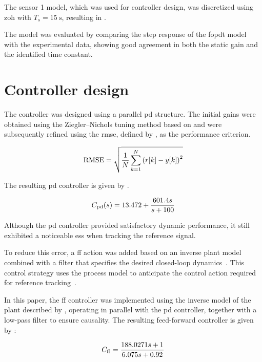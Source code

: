 \documentclass[journal,twoside,a4paper]{SCIndustria}
\begin{document}
{The sensor 1 model, which was used for controller design, was discretized using
\gls{zoh} with $T_s = \SI{15}{\second}$, resulting in .

The model was evaluated by comparing the step response of the \gls{fopdt} model with the experimental data, showing good agreement in both the static gain and the identified time constant. 
\section{Controller design}
The controller was designed using a parallel \gls{pd} structure. The initial
gains were obtained using the Ziegler--Nichols tuning method based on
 and were subsequently refined using the \gls{rmse},
defined by , as the performance criterion.

\begin{equation}
\eqlabel{rmse}
\mathrm{RMSE} = \sqrt{\frac{1}{N}\sum_{k=1}^{N}{\left( r[k] - y[k] \right)}^{2}}
\end{equation}

The resulting \gls{pd} controller is given by .

\begin{equation}
\eqlabel{controlador-pd-paralelo}
C_{\mathrm{pd}}(s) = 13.472 + \frac{601.4s}{s+100}
\end{equation}

Although the \gls{pd} controller provided satisfactory dynamic performance, it
still exhibited a noticeable \gls{ess} when tracking the reference signal.

To reduce this error, a \gls{ff} action was added based on an inverse plant
model combined with a filter that specifies the desired closed-loop
dynamics~\cite{astrom2021feedback,seborg2016process}.
This control strategy uses the process model to anticipate the control action
required for reference tracking~\cite{astrom2021feedback}.

In this paper, the \gls{ff} controller was implemented using the inverse model
of the plant described by , operating in parallel with
the \gls{pd} controller, together with a low-pass filter to ensure causality.
The resulting feed-forward controller is given by :

\begin{equation}
\eqlabel{controlador-ff}
C_{\mathrm{ff}} = \frac{188.0271s + 1}{6.075 s + 0.92}
\end{equation}

}
\end{document}
